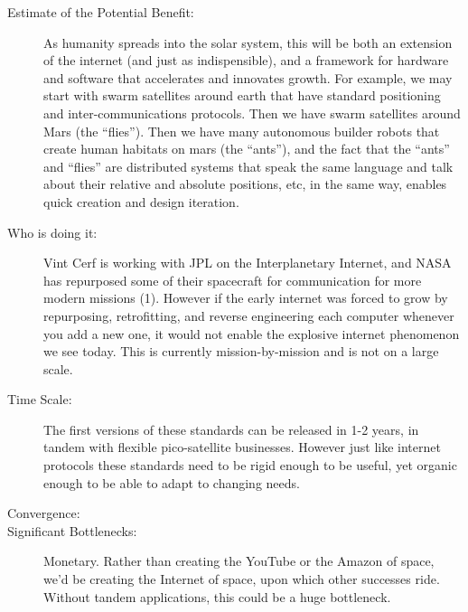 \begin{description}
\item[Estimate of the Potential Benefit:] As humanity spreads into the solar system, this will be both   an extension of the internet (and just as indispensible), and a   framework for hardware and software that accelerates and innovates   growth. For example, we may start with swarm satellites around earth   that have standard positioning and inter-communications protocols. Then   we have swarm satellites around Mars (the ``flies''). Then we have many   autonomous builder robots that create human habitats on mars (the   ``ants''), and the fact that the ``ants'' and ``flies'' are distributed  systems that speak the same language and talk about their relative and   absolute positions, etc, in the same way, enables quick creation and   design iteration.
 
\item[Who is doing it:]
Vint Cerf is working with \gls{JPL} on   the Interplanetary Internet, and NASA has repurposed some of their  spacecraft for communication for more modern missions (1). However if   the early internet was forced to grow by repurposing, retrofitting, and   reverse engineering each computer whenever you add a new one, it would   not enable the explosive internet phenomenon we see today. This is   currently mission-by-mission and is not on a large scale.
 
\item[Time Scale:] The first  versions of these standards can be released in 1-2 years, in tandem  with  flexible pico-satellite businesses. However just like internet   protocols these standards need to be rigid enough to be useful, yet   organic enough to be able to adapt to changing needs.
 
\item[Convergence:] 
 
\item[Significant Bottlenecks:]   Monetary. Rather than creating the YouTube or the Amazon of space, we'd   be creating the Internet of space, upon which other successes ride.   Without tandem applications, this could be a huge bottleneck.
 
\cite{ipsnig}
\end{description}

 
